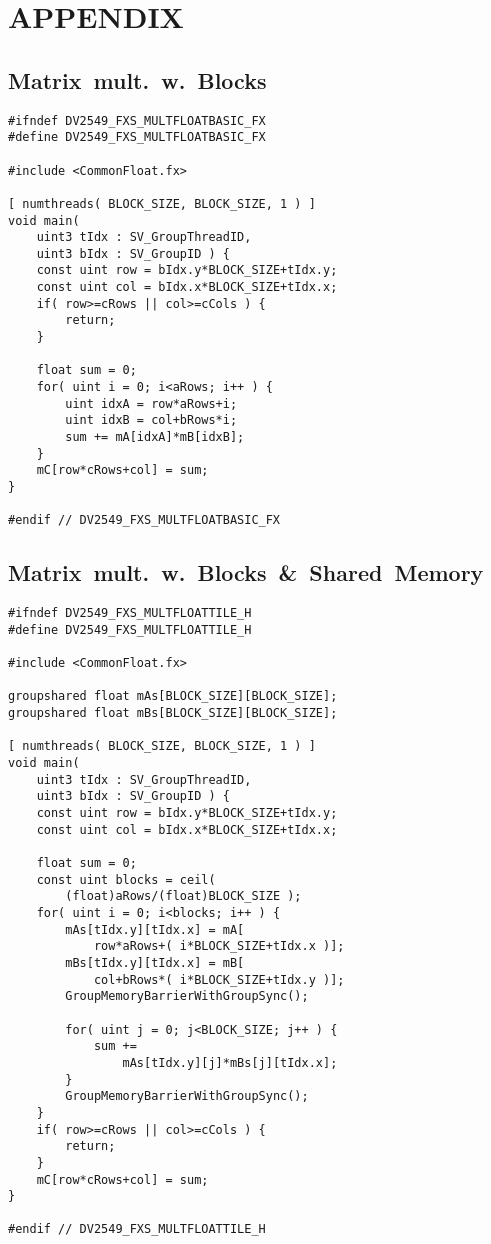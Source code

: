 \documentclass[a4paper,twocolumn,10pt]{article}
\begin{document}
\newpage





\newpage

\section{APPENDIX}
\label{sec:appendix}

\subsection*{Matrix~mult.~w.~Blocks}
\begin{lstlisting}
#ifndef DV2549_FXS_MULTFLOATBASIC_FX
#define DV2549_FXS_MULTFLOATBASIC_FX

#include <CommonFloat.fx>

[ numthreads( BLOCK_SIZE, BLOCK_SIZE, 1 ) ]
void main(
	uint3 tIdx : SV_GroupThreadID,
	uint3 bIdx : SV_GroupID ) {
	const uint row = bIdx.y*BLOCK_SIZE+tIdx.y;
	const uint col = bIdx.x*BLOCK_SIZE+tIdx.x;
	if( row>=cRows || col>=cCols ) {
		return;
	}
    
	float sum = 0;
	for( uint i = 0; i<aRows; i++ ) {
		uint idxA = row*aRows+i;
		uint idxB = col+bRows*i;
		sum += mA[idxA]*mB[idxB];
	}
	mC[row*cRows+col] = sum;
}

#endif // DV2549_FXS_MULTFLOATBASIC_FX
\end{lstlisting}

\newpage
\vspace*{0.08cm} %

\subsection*{Matrix~mult.~w.~Blocks~\&~Shared~Memory}
\begin{lstlisting}
#ifndef DV2549_FXS_MULTFLOATTILE_H
#define DV2549_FXS_MULTFLOATTILE_H

#include <CommonFloat.fx>

groupshared float mAs[BLOCK_SIZE][BLOCK_SIZE];
groupshared float mBs[BLOCK_SIZE][BLOCK_SIZE];

[ numthreads( BLOCK_SIZE, BLOCK_SIZE, 1 ) ]
void main(
	uint3 tIdx : SV_GroupThreadID,
	uint3 bIdx : SV_GroupID ) {
	const uint row = bIdx.y*BLOCK_SIZE+tIdx.y;
	const uint col = bIdx.x*BLOCK_SIZE+tIdx.x;
	
	float sum = 0;
	const uint blocks = ceil( 
		(float)aRows/(float)BLOCK_SIZE );
	for( uint i = 0; i<blocks; i++ ) {
		mAs[tIdx.y][tIdx.x] = mA[ 
			row*aRows+( i*BLOCK_SIZE+tIdx.x )];
		mBs[tIdx.y][tIdx.x] = mB[ 
			col+bRows*( i*BLOCK_SIZE+tIdx.y )];
		GroupMemoryBarrierWithGroupSync();

		for( uint j = 0; j<BLOCK_SIZE; j++ ) {
			sum += 
				mAs[tIdx.y][j]*mBs[j][tIdx.x];
		}
		GroupMemoryBarrierWithGroupSync();
	}
	if( row>=cRows || col>=cCols ) {
		return;
	}
	mC[row*cRows+col] = sum;
}

#endif // DV2549_FXS_MULTFLOATTILE_H

\end{lstlisting}
\end{document}
